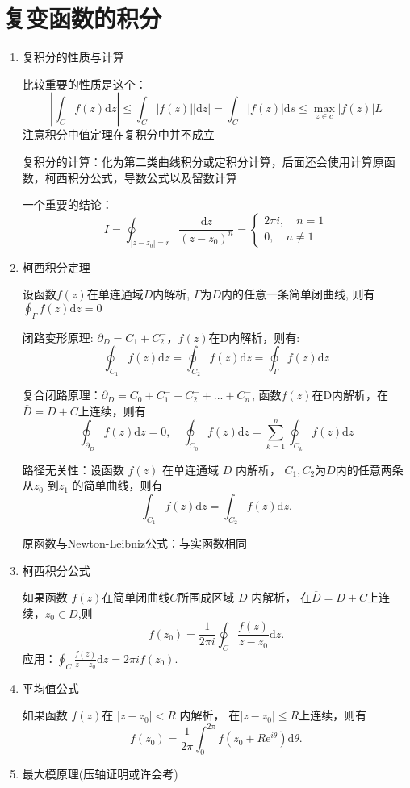 \documentclass[a4paper,11pt,UTF8]{article}
\begin{document}
\section{复变函数的积分}
\begin{enumerate}
	\item 复积分的性质与计算
	
	比较重要的性质是这个：$$
	\left|\int_Cf(z)\mathrm{d}z\right|\leq\int_C|f(z)||\mathrm{d}z|=\int_C|f(z)|\mathrm{d}s\leq \max_{z\in c}|f(z)| L
	$$
	注意积分中值定理在复积分中并不成立
	
	复积分的计算：化为第二类曲线积分或定积分计算，后面还会使用计算原函数，柯西积分公式，导数公式以及留数计算
	
	一个重要的结论：$$I=\oint_{|z-z_0|=r}\frac{\mathrm{d}z}{(z-z_0)^n}=\begin{cases}
		2\pi i,\quad n=1 \\0, \quad n\neq1
	\end{cases}$$
	\item 柯西积分定理
	
	设函数$f(z)$在单连通域$D$内解析, $\Gamma$为$D$内的任意一条简单闭曲线, 则有$\displaystyle\oint_{\Gamma}f(z)\mathrm{d}z=0$
	
	闭路变形原理: $\partial_D=C_1+C_2^-$，$f(z)$在D内解析，则有:$$\displaystyle\oint_{C_1}f(z)\mathrm{d}z=\oint_{C_2}f(z)\mathrm{d}z=\oint_\Gamma f(z)\mathrm{d}z$$
	
	复合闭路原理：$\partial_D=C_0+C_1^-+C_2^-+...+C_n^-$, 函数$f(z)$在D内解析，在$\overline{D}=D+C$上连续，则有
	$$\oint_{\partial_D}f(z)\mathrm{d}z=0,\quad \oint_{C_0}f(z)\mathrm{d}z=\sum_{k=1}^{n}\oint_{C_k}f(z)\mathrm{d}z$$
	
	路径无关性：设函数 $f(z)$ 在单连通域 $D$ 内解析， $C_1,C_2$为$D$内的任意两条从$z_0$ 到$z_1$ 的简单曲线，则有
	$$
	\int_{C_1}f(z)\mathrm{d}z=\int_{C_2}f(z)\mathrm{d}z.
	$$
	
	原函数与Newton-Leibniz公式：与实函数相同
	\item 柯西积分公式
	
	如果函数 $f(z)$在简单闭曲线$C$所围成区域 $D$ 内解析， 在$\overline{D}=D+C$上连续，$z_0\in D$,则
	$$
	f(z_0)=\frac1{2\pi i}\oint_C\frac{f(z)}{z-z_0}\mathrm{d}z.
	$$
	应用：$
	\displaystyle\oint_C\frac{f(z)}{z-z_0}\mathrm{d}z=2\pi if(z_0).
	$
	\item 平均值公式
	
	如果函数 $f(z)$在 $|z-z_0|<R$ 内解析， 在$|z-z_0|\leq R$上连续，则有
	$$
	f(z_0)=\frac1{2\pi}\int_0^{2\pi}f(z_0+R\mathrm{e}^{i\theta})\mathrm{d}\theta.
	$$
	\item 最大模原理(压轴证明或许会考)
	

\end{enumerate}
\end{document}

